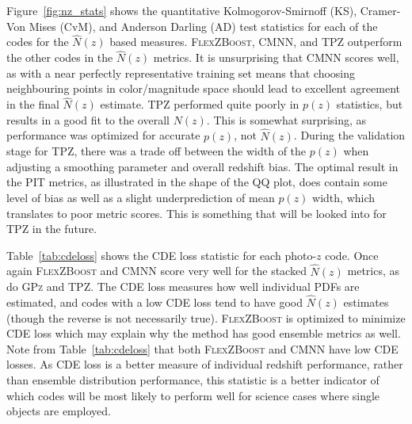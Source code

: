 Figure~\ref{fig:nz_stats} shows the quantitative Kolmogorov-Smirnoff (KS), Cramer-Von Mises (CvM), and Anderson Darling (AD) test statistics for each of the codes for the $\hat{N}(z)$ based measures.
\textsc{FlexZBoost}, \textsc{CMNN}, and \textsc{TPZ} outperform the other codes in the $\hat{N}(z)$ metrics.
It is unsurprising that \textsc{CMNN} scores well, as with a near perfectly representative training set means that choosing neighbouring points in color/magnitude space should lead to excellent agreement in the final $\hat{N}(z)$ estimate.  \textsc{TPZ} performed quite poorly in $p(z)$ statistics, but results in a good fit to the overall $N(z)$.  This is somewhat surprising, as performance was optimized for accurate $p(z)$, not $\hat{N}(z)$.  During the validation stage for \textsc{TPZ}, there was a trade off between the width of the $p(z)$ when adjusting a smoothing parameter and overall redshift bias.  The optimal result in the PIT metrics, as illustrated in the shape of the QQ plot, does contain some level of bias as well as a slight underprediction of mean $p(z)$ width, which translates to poor metric scores.  This is something that will be looked into for \textsc{TPZ} in the future.



Table~\ref{tab:cdeloss} shows the CDE loss statistic for each photo-$z$ code.  Once again \textsc{FlexZBoost} and \textsc{CMNN} score very well for the stacked $\hat{N}(z)$ metrics, as do \textsc{GPz} and \textsc{TPZ}.  The CDE loss measures how well individual PDFs are estimated, and codes with a low CDE loss tend to have good $\hat{N}(z)$ estimates (though the reverse is not necessarily true). \textsc{FlexZBoost} is optimized to minimize CDE loss which may explain why the method has good ensemble metrics as well. Note from Table~\ref{tab:cdeloss} that both \textsc{FlexZBoost} and \textsc{CMNN} have low CDE losses.  %
As CDE loss is a better measure of individual redshift performance, rather than ensemble distribution performance, this statistic is a better indicator of which codes will be most likely to perform well for science cases where single objects are employed.

